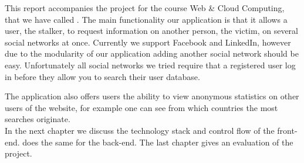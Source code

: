 
This report accompanies the project for the course Web \& Cloud Computing, that we have called \stalker. The main functionality our application \stalker is that it allows a user, the stalker, to request information on another person, the victim, on several social networks at once. Currently we support Facebook and LinkedIn, however due to the modularity of our application adding another social network should be easy. Unfortunately all social networks we tried require that a registered user log in before they allow you to search their user database.

The application also offers users the ability to view anonymous statistics on other users of the website, for example one can see from which countries the most searches originate. \\

In the next chapter we discuss the technology stack and control flow of the front-end.  does the same for the back-end. The last chapter gives an evaluation of the project. 

